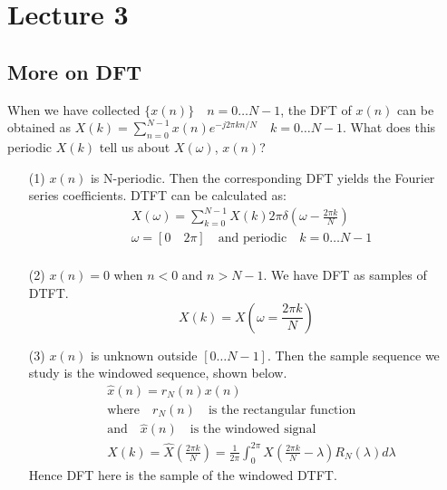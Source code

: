 \chapter*{Lecture 3}

\section*{More on DFT}
When we have collected $\{x(n)\} \quad n = 0 \dots N-1$, 
the DFT of $x(n)$ can be obtained as 
$X(k)=\sum_{n=0}^{N-1}x(n)e^{-j2\pi k n / N} \quad k = 0 \dots N-1$.
What does this periodic $X(k)$ tell us about $X(\omega)$, $x(n)$?

\begin{itemize}
\item[(1)] $x(n)$ is N-periodic. Then the corresponding DFT yields the Fourier 
series coefficients. DTFT can be calculated as:
\begin{equation}
  \label{eq:dftdtft}
  \begin{aligned}
    & X(\omega)=\sum_{k=0}^{N-1}X(k)2\pi\delta(\omega-\frac{2\pi k}{N}) \\
    & \omega = [0 \quad 2\pi] \quad \text{and periodic} \quad k = 0 \dots N-1\\ 
  \end{aligned}
\end{equation}
\item[(2)] $x(n)=0$ when $n<0$ and $n > N-1$. We have DFT as samples 
of DTFT.
  \begin{equation}
    \label{eq:dftsample}
    X(k) = X(\omega=\frac{2\pi k}{N})
  \end{equation}
\item[(3)]$x(n)$ is unknown outside $[0 \dots N-1]$. Then the sample sequence 
we study is the windowed sequence, shown below.
\begin{equation}
  \label{eq:dftwindow}
  \begin{aligned}
   &  \hat{x}(n) = r_N(n)x(n) \\
   & \text{where} \quad r_N(n) \quad \text{is the rectangular function} \\
   & \text{and} \quad \hat{x}(n) \quad \text{is the windowed signal}\\
  & X(k) = \hat{X}(\frac{2\pi k}{N}) = \frac{1}{2\pi}\int_{0}^{2\pi}X(\frac{2\pi k}{N}-\lambda)R_N(\lambda)d\lambda
  \end{aligned}
\end{equation}
Hence DFT here is the sample of the windowed DTFT.
\end{itemize}

